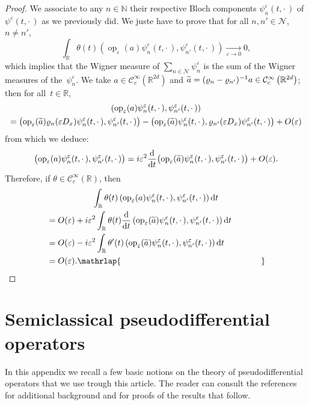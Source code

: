 \documentclass[AHL,Unicode,longabstracts]{cedram}
\DeclareMathOperator{\op}{op}
\newcommand*\R{{\mathbb R}}
\newcommand*\N{{\mathbb N}}
\newcommand*\eps{\varepsilon}
\numberwithin{equation}{section}
\def\Tend#1#2{\mathop{\longrightarrow}\limits_{#1\rightarrow#2}}
\let\oldtilde\tilde
\renewcommand*{\tilde}[1]{\mathchoice{\widetilde{#1}}{\widetilde{#1}}{\oldtilde{#1}}{\oldtilde{#1}}}
\newcommand*{\dd}{\mathrm{d}}
\newcommand*{\dt}{\dd t}
\begin{document}
\begin{proof}
We associate to any $n\in \N$ their respective Bloch components $\psi^\eps_n(t,\cdot\,)$ of $\psi^\eps (t,\cdot\,)$ as we previously did. We juste have to prove that for all $n,n'\in{\mathcal N}$, $n\not=n'$,
\[
\int_\R\theta(t) \left({\op}_\eps(a) \psi^\eps_n(t,\cdot\,),\psi^\eps_{n'}(t,\cdot\,)\right)\Tend{\eps}{0} 0,
\]
which implies that the Wigner measure of $\sum_{n\in{\mathcal N}}\psi^\eps_n$ is the sum of the Wigner measures of the~$\psi^\eps_n$. We take $a\in{\mathcal C}_c^\infty (\R^{2d})$ and $\tilde{a} = (\varrho_n-\varrho_{n'})^{-1} a \in {\mathcal C}_c^\infty\left(\R^{2d}\right)$; then for all~$t\in\R$,
\begin{multline*}
\left({\op}_\eps(a) \psi^\eps_n(t,\cdot\,),\psi^\eps_{n'}(t,\cdot\,)\right) \\
= \big({\op}_\eps(\tilde{a})\varrho_n(\eps D_x) \psi^\eps_n(t,\cdot\,),\psi^\eps_{n'}(t,\cdot\,)\big) - \big({\op}_\eps(\tilde{a}) \psi^\eps_n(t,\cdot\,),\varrho_{n'}(\eps D_x)\psi ^\eps_{n'}(t,\cdot\,)\big) + O(\eps)
\end{multline*}
from which we deduce:
\[
\big({\op}_\eps(a) \psi^\eps_n(t,\cdot\,),\psi^\eps_{n'}(t,\cdot\,)\big)= i\eps^2 \frac{\dd}{\dt} \big({\op}_\eps(\tilde{a}) \psi^\eps_n(t,\cdot\,),\psi^\eps_{n'}(t,\cdot\,)\big) +O(\eps).
\]
Therefore, if $\theta\in {\mathcal C}_c^\infty(\R)$, then
\begin{multline*}
\int_\R \theta(t) \left({\op}_\eps(a) \psi^\eps_n(t,\cdot\,),\psi^\eps_{n'}(t,\cdot\,)\right)\dt\\
\begin{aligned}
&= O(\eps) + i\eps^2 \int _\R \theta(t) \frac{\dd}{\dt} \left({\op}_\eps(\tilde{a}) \psi^\eps_n(t,\cdot\,),\psi^\eps_{n'}(t,\cdot\,)\right) \dt\\
&= O(\eps) - i\eps^2 \int _\R \theta'(t) \left({\op}_\eps(\tilde{a})\psi^\eps_n(t,\cdot\,),\psi^\eps_{n'}(t,\cdot\,)\right)\dt \\
&= O(\eps). \mathrlap{\mkern 301mu\qed}
\end{aligned}
\end{multline*}
\let\qed\relax
\end{proof}



\appendix
\section{Semiclassical pseudodifferential operators}\label{sec:pdo}

In this appendix we recall a few basic notions on the theory of pseudodifferential operators that we use trough this article. The reader can consult the references~\cite{AlinhacGerard, DimassiSjostrand, F:14, MartinezBook, Zwobook} for additional background and for proofs of the results that follow.
\end{document}
